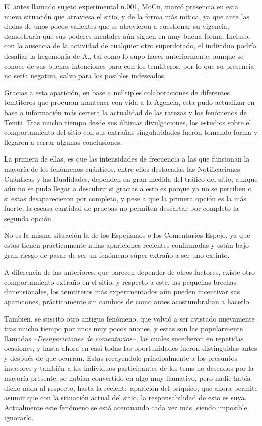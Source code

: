 \documentclass[
  spanish,
]{book}
\begin{document}
El antes llamado sujeto experimental n.001, MoCn, marcó presencia en esta nueva situación que atraviesa el sitio, y de la forma más mítica, ya que ante las dudas de unos pocos valientes que se atrevieron a cuestionar su vigencia, demostraría que sus poderes mentales aún siguen en muy buena forma. Incluso, con la ausencia de la actividad de cualquier otro superdotado, el individuo podría desafiar la hegemonía de A., tal como lo supo hacer anteriormente, aunque se conoce de sus buenas intenciones para con los temtiteros, por lo que su presencia no sería negativa, salvo para los posibles indeseados.

Gracias a esta aparición, en base a múltiples colaboraciones de diferentes temtiteros que procuran mantener con vida a la Agencia, esta pudo actualizar en base a información más certera la actualidad de las rarezas y los fenómenos de Temti. Tras mucho tiempo desde sus últimas divulgaciones, los estudios sobre el comportamiento del sitio con sus extrañas singularidades fueron tomando forma y llegaron a cerrar algunas conclusiones.

La primera de ellas, es que las intensidades de frecuencia a las que funcionan la mayoría de los fenómenos cuánticos, entre ellos destacadas las Notificaciones Cuánticas y las Dualidades, dependen en gran medida del tráfico del sitio, aunque aún no se pudo llegar a descubrir si gracias a esto es porque ya no se perciben o si estas desaparecieron por completo, y pese a que la primera opción es la más fuerte, la escasa cantidad de pruebas no permiten descartar por completo la segunda opción.

No es la misma situación la de los Espejismos o los Comentarios Espejo, ya que estos tienen prácticamente nulas apariciones recientes confirmadas y están bajo gran riesgo de pasar de ser un fenómeno súper extraño a ser uno extinto.

A diferencia de las anteriores, que parecen depender de otros factores, existe otro comportamiento extraño en el sitio, y respecto a este, las pequeñas brechas dimensionales, los temtiteros más experimentados aún pueden incentivar sus apariciones, prácticamente sin cambios de como antes acostumbraban a hacerlo.

También, se suscito otro antiguo fenómeno, que volvió a ser avistado nuevamente tras mucho tiempo por unos muy pocos anones, y estas son las popularmente llamadas \emph{--Desapariciones de comentarios--}, las cuales sucedieron en repetidas ocasiones, y hasta ahora en casi todas las oportunidades fueron distinguidas antes y después de que ocurran. Estas recayendole principalmente a los presuntos invasores y también a los individuos participantes de los tems no deseados por la mayoría presente, se habían convertido en algo muy llamativo, pero nadie había dicho nada al respecto, hasta la reciente aparición del psíquico, que ahora permite asumir que con la situación actual del sitio, la responsabilidad de esto es suya. Actualmente este fenómeno se está acentuando cada vez más, siendo imposible ignorarlo.
\end{document}
